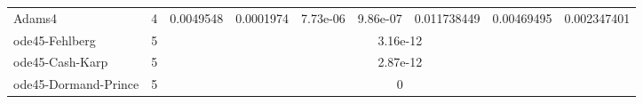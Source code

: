 \documentclass[conference,onecolumn,12pt]{IEEEtran}
\begin{document}
\begin{table}[htbp]
{\begin{tabular}{lrccccccc}
  Adams4 & 4     & \multicolumn{1}{r}{0.0049548} & \multicolumn{1}{r}{0.0001974} & \multicolumn{1}{r}{7.73e-06} & \multicolumn{1}{r}{9.86e-07} & \multicolumn{1}{r}{0.011738449} & \multicolumn{1}{r}{0.00469495} & \multicolumn{1}{r}{0.002347401} \\
  ode45-Fehlberg & 5     & \multicolumn{7}{c}{3.16e-12} \\
  ode45-Cash-Karp & 5     & \multicolumn{7}{c}{2.87e-12} \\
  ode45-Dormand-Prince & 5     & \multicolumn{7}{c}{0} \\
  \bottomrule
  \end{tabular}%
      }
  \label{tab:1}
\end{table}%

\begin{table}[htbp]
  \centering
  \caption{$T=10,(1,1,1)^\top$}
  \resizebox{\textwidth}{!}{

}
\end{table}
\end{document}
